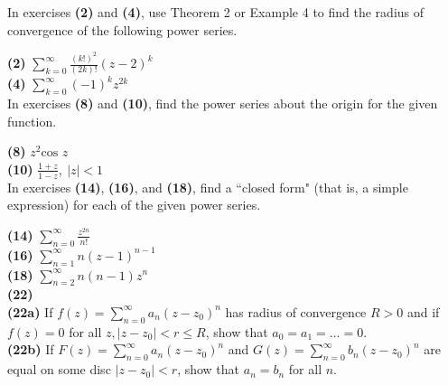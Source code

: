 \documentclass[12pt,letterpaper]{article}
\begin{document}
In exercises \textbf{(2)} and \textbf{(4)}, use Theorem 2 or Example 4 to find the radius of convergence of the following power series.

\textbf{(2)} \(\sum_{k=0}^{\infty}\frac{(k!)^{2}}{(2k)!}(z-2)^{k}\) \\



\textbf{(4)} \(\sum_{k=0}^{\infty}(-1)^{k}z^{2k}\) \\



In exercises \textbf{(8)} and \textbf{(10)}, find the power series about the origin for the given function.

\textbf{(8)} \(z^{2}\text{cos } z\) \\



\textbf{(10)} \(\frac{1+z}{1-z},\ |z|<1\) \\



In exercises \textbf{(14)}, \textbf{(16)}, and \textbf{(18)}, find a ``closed form" (that is, a simple expression) for each of the given power series. 

\textbf{(14)} \(\sum_{n=0}^{\infty} \frac{z^{2n}}{n!}\) \\



\textbf{(16)} \(\sum_{n=1}^{\infty} n(z-1)^{n-1} \) \\



\textbf{(18)} \(\sum_{n = 2}^{\infty} n(n-1)z^{n} \) \\



\textbf{(22)} \\

\textbf{(22a)} If \(f(z) = \sum_{n=0}^{\infty} a_{n}(z-z_{0})^{n}\) has radius of convergence \(R > 0 \) and if \(f(z) = 0\) for all \(z, |z-z_{0}| < r \leq R \), show that \(a_{0} = a_{1} = ... = 0\). \\



\textbf{(22b)} If \(F(z) = \sum_{n=0}^{\infty} a_{n}(z - z_{0})^{n}\) and \(G(z) = \sum_{n=0}^{\infty} b_{n}(z-z_{0})^{n}\) are equal on some disc \(|z - z_{0}|< r\), show that \(a_{n} = b_{n}\) for all \(n\). \\





\textbf{}
\end{document}
